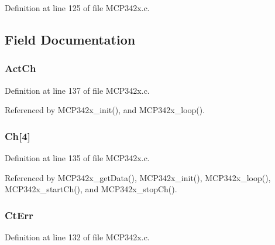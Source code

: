 Definition at line 125 of file M\-C\-P342x.\-c.



\subsection{Field Documentation}
\hypertarget{structtag_m_c_p342x_a5409b7b9c64e9f1f92d6aa5f39152103}{
\subsubsection[{Act\-Ch}]{ Act\-Ch}}\label{structtag_m_c_p342x_a5409b7b9c64e9f1f92d6aa5f39152103}


Definition at line 137 of file M\-C\-P342x.\-c.



Referenced by M\-C\-P342x\-\_\-init(), and M\-C\-P342x\-\_\-loop().

\hypertarget{structtag_m_c_p342x_ac430268b4a9aeacbabc611343812e308}{
\subsubsection[{Ch}]{ Ch\mbox{[}4\mbox{]}}}\label{structtag_m_c_p342x_ac430268b4a9aeacbabc611343812e308}


Definition at line 135 of file M\-C\-P342x.\-c.



Referenced by M\-C\-P342x\-\_\-get\-Data(), M\-C\-P342x\-\_\-init(), M\-C\-P342x\-\_\-loop(), M\-C\-P342x\-\_\-start\-Ch(), and M\-C\-P342x\-\_\-stop\-Ch().

\hypertarget{structtag_m_c_p342x_a0577a7cb96b0af0dda91c4efe1150643}{
\subsubsection[{Ct\-Err}]{ Ct\-Err}}\label{structtag_m_c_p342x_a0577a7cb96b0af0dda91c4efe1150643}


Definition at line 132 of file M\-C\-P342x.\-c.



